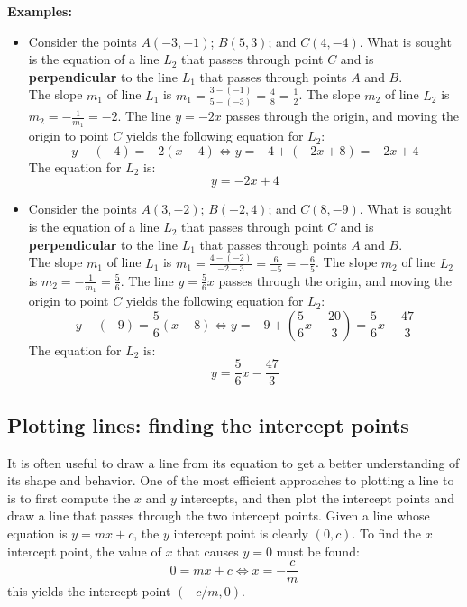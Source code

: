 \documentclass{article}
\begin{document}
\textbf{Examples:}
\begin{itemize}
\item Consider the points \(A(-3, -1)\); \(B(5, 3)\); and \(C(4, -4)\). What is sought is the equation of a line \(L_2\) that passes through point \(C\) and is {\bf perpendicular} to the line \(L_1\) that passes through points \(A\) and \(B\). \\
The slope \(m_1\) of line \(L_1\) is \(m_1 = \frac{3 - (-1)}{5 - (-3)} = \frac{4}{8} = \frac{1}{2}\). The slope \(m_2\) of line \(L_2\) is \(m_2 = -\frac{1}{m_1} = -2\). The line \(y = -2x\) passes through the origin, and moving the origin to point \(C\) yields the following equation for \(L_2\):
\[y - (-4) = -2(x - 4) \iff y = -4 + (-2x + 8) = -2x + 4\]
The equation for \(L_2\) is: 
\[y = -2x + 4\]
\item Consider the points \(A(3, -2)\); \(B(-2, 4)\); and \(C(8, -9)\). What is sought is the equation of a line \(L_2\) that passes through point \(C\) and is {\bf perpendicular} to the line \(L_1\) that passes through points \(A\) and \(B\). \\
The slope \(m_1\) of line \(L_1\) is \(m_1 = \frac{4 - (-2)}{-2 - 3} = \frac{6}{-5} = -\frac{6}{5}\). The slope \(m_2\) of line \(L_2\) is \(m_2 = -\frac{1}{m_1} = \frac{5}{6}\). The line \(y = \frac{5}{6}x\) passes through the origin, and moving the origin to point \(C\) yields the following equation for \(L_2\):
\[y - (-9) = \frac{5}{6}(x - 8) \iff y = -9 + (\frac{5}{6}x - \frac{20}{3}) = \frac{5}{6}x - \frac{47}{3}\]
The equation for \(L_2\) is: 
\[y = \frac{5}{6}x - \frac{47}{3}\]
\end{itemize}



\subsection*{Plotting lines: finding the intercept points}

It is often useful to draw a line from its equation to get a better understanding of its shape and behavior. One of the most efficient approaches to plotting a line to is to first compute the \(x\) and \(y\) intercepts, and then plot the intercept points and draw a line that passes through the two intercept points. Given a line whose equation is \(y = mx + c\), the \(y\) intercept point is clearly \((0, c)\). To find the \(x\) intercept point, the value of \(x\) that causes \(y = 0\) must be found:
\[0 = mx + c \iff x = -\frac{c}{m}\]  
this yields the intercept point \((-c/m, 0)\).
\end{document}
